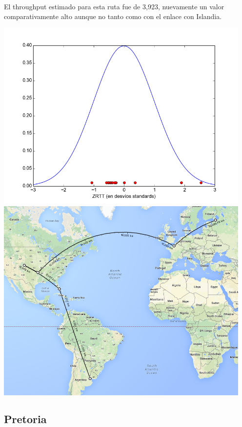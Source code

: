  El throughput estimado para esta ruta fue de 3,923, nuevamente un valor comparativamente alto aunque no tanto como con el enlace con Islandia.

 \includegraphics[width=5in]{imgs/perm_dist.png}
 \includegraphics[width=5in]{imgs/maps/perm.png}

\subsection{Pretoria}


